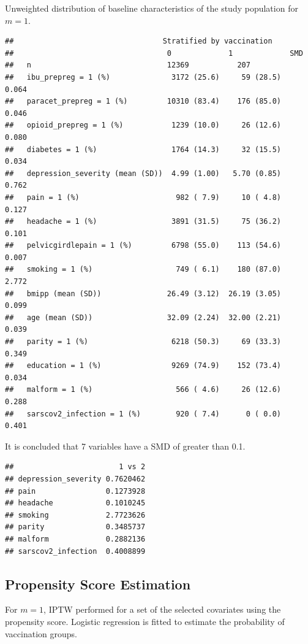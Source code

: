 \documentclass[
]{article}
\begin{document}
Unweighted distribution of baseline characteristics of the study
population for \(m=1\).

\begin{verbatim}
##                                  Stratified by vaccination
##                                   0             1             SMD   
##   n                               12369           207               
##   ibu_prepreg = 1 (%)              3172 (25.6)     59 (28.5)   0.064
##   paracet_prepreg = 1 (%)         10310 (83.4)    176 (85.0)   0.046
##   opioid_prepreg = 1 (%)           1239 (10.0)     26 (12.6)   0.080
##   diabetes = 1 (%)                 1764 (14.3)     32 (15.5)   0.034
##   depression_severity (mean (SD))  4.99 (1.00)   5.70 (0.85)   0.762
##   pain = 1 (%)                      982 ( 7.9)     10 ( 4.8)   0.127
##   headache = 1 (%)                 3891 (31.5)     75 (36.2)   0.101
##   pelvicgirdlepain = 1 (%)         6798 (55.0)    113 (54.6)   0.007
##   smoking = 1 (%)                   749 ( 6.1)    180 (87.0)   2.772
##   bmipp (mean (SD))               26.49 (3.12)  26.19 (3.05)   0.099
##   age (mean (SD))                 32.09 (2.24)  32.00 (2.21)   0.039
##   parity = 1 (%)                   6218 (50.3)     69 (33.3)   0.349
##   education = 1 (%)                9269 (74.9)    152 (73.4)   0.034
##   malform = 1 (%)                   566 ( 4.6)     26 (12.6)   0.288
##   sarscov2_infection = 1 (%)        920 ( 7.4)      0 ( 0.0)   0.401
\end{verbatim}

It is concluded that 7 variables have a SMD of greater than 0.1.

\begin{verbatim}
##                        1 vs 2
## depression_severity 0.7620462
## pain                0.1273928
## headache            0.1010245
## smoking             2.7723626
## parity              0.3485737
## malform             0.2882136
## sarscov2_infection  0.4008899
\end{verbatim}

\hypertarget{propensity-score-estimation}{%
\subsection{Propensity Score
Estimation}\label{propensity-score-estimation}}

For \(m = 1\), IPTW performed for a set of the selected covariates using
the propensity score. Logistic regression is fitted to estimate the
probability of vaccination groups.
\end{document}
